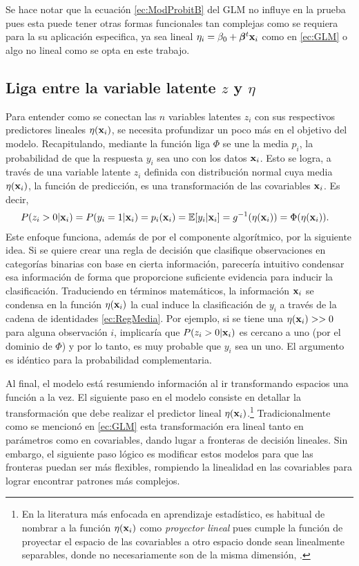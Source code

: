 \documentclass[../Main/Main.tex]{subfiles}
\begin{document}
Se hace notar que la ecuación \eqref{ec:ModProbitB} del GLM no influye en la prueba pues esta puede tener otras formas funcionales tan complejas como se requiera para la su aplicación especifica, ya sea lineal $\eta_i = \beta_0 + \bm{\beta}^t\mathbf{x}_i$ como en \eqref{ec:GLM} o algo no lineal como se opta en este trabajo.

\subsection*{Liga entre la variable latente $z$ y $\eta$} \label{sec:VarLat}
Para entender como se conectan las $n$ variables latentes $z_i$ con sus respectivos predictores lineales $\eta(\mathbf{x}_i)$, se necesita profundizar un poco más en el objetivo del modelo. Recapitulando, mediante la función liga $\Phi$ se une la media $p_i$, la probabilidad de que la respuesta $y_i$ sea uno con los datos $\mathbf{x}_i$. Esto se logra, a través de una variable latente $z_i$ definida con distribución normal cuya media $\eta(\mathbf{x}_i)$, la función de predicción, es una transformación de las covariables $\mathbf{x}_i$. Es decir,
\begin{align} \label{ec:RegMedia}
	P(z_i > 0|\mathbf{x}_i) = P(y_i = 1|\mathbf{x}_i)= p_i(\mathbf{x}_i) &=\mathbb{E}[y_i|\mathbf{x}_i] = g^{-1}(\eta(\mathbf{x}_i)) = \Phi(\eta(\mathbf{x}_i)).
\end{align}
Este enfoque funciona, además de por el componente algorítmico, por la siguiente idea. Si se quiere crear una regla de decisión que clasifique observaciones en categorías binarias con base en cierta información, parecería intuitivo condensar esa información de forma que proporcione suficiente evidencia para inducir la clasificación. Traduciendo en términos matemáticos, la información $\mathbf{x}_i$ se condensa en la función $\eta(\mathbf{x}_i)$ la cual induce la clasificación de $y_i$ a través de la cadena de identidades \eqref{ec:RegMedia}. Por ejemplo, si se tiene una $\eta(\mathbf{x}_i)>>0$ para alguna observación $i$, implicaría que $P(z_i > 0|\mathbf{x}_i)$ es cercano a uno (por el dominio de $\Phi$) y por lo tanto, es muy probable que $y_i$ sea un uno. El argumento es idéntico para la probabilidad complementaria.

Al final, el modelo está resumiendo información al ir transformando espacios una función a la vez. El siguiente paso en el modelo consiste en detallar la transformación que debe realizar el predictor lineal $\eta(\mathbf{x}_i)$.\footnote{En la literatura más enfocada en aprendizaje estadístico, es habitual de nombrar a la función $\eta(\mathbf{x}_i)$ como  \textit{proyector lineal} pues cumple la función de proyectar el espacio de las covariables a otro espacio donde sean linealmente separables, donde no necesariamente son de la misma dimensión, \citet{bishop2006pattern}.} Tradicionalmente como se mencionó en \eqref{ec:GLM} esta transformación era lineal tanto en parámetros como en covariables, dando lugar a fronteras de decisión lineales. Sin embargo, el siguiente paso lógico es modificar estos modelos para que las fronteras puedan ser más flexibles, rompiendo la linealidad en las covariables para lograr encontrar patrones más complejos. 
\end{document}
